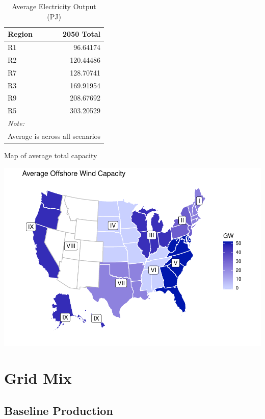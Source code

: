 \documentclass[]{article}
\begin{document}
\begin{table}[!h]

\caption{\label{tab:unnamed-chunk-3}Average Electricity Output (PJ)}
\centering
\begin{tabular}{lr}
\toprule
Region & 2050 Total\\
\midrule
\rowcolor{gray!6}  R1 & 96.64174\\
R2 & 120.44486\\
\rowcolor{gray!6}  R7 & 128.70741\\
R3 & 169.91954\\
\rowcolor{gray!6}  R9 & 208.67692\\
R5 & 303.20529\\
\bottomrule
\multicolumn{2}{l}{\textit{Note: }}\\
\multicolumn{2}{l}{Average is across all scenarios}\\
\end{tabular}
\end{table}

Map of average total capacity

\includegraphics{osw_Report_files/figure-latex/unnamed-chunk-19-1.pdf}

\hypertarget{grid-mix}{%
\section{Grid Mix}\label{grid-mix}}

\hypertarget{baseline-production}{%
\subsection{Baseline Production}\label{baseline-production}}
\end{document}
